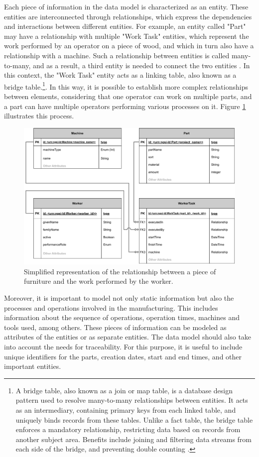 Each piece of information in the data model is characterized as an entity. These entities are interconnected through relationships, which express the dependencies and interactions between different entities. For example, an entity called "Part" may have a relationship with multiple "Work Task" entities, which represent the work performed by an operator on a piece of wood, and which in turn also have a relationship with a machine. Such a relationship between entities is called many-to-many, and as a result, a third entity is needed to connect the two entities \cite{fiware_entity_relationship}. In this context, the "Work Task" entity acts as a linking table, also known as a bridge table.\footnote{A bridge table, also known as a join or map table, is a database design pattern used to resolve many-to-many relationships between entities. It acts as an intermediary, containing primary keys from each linked table, and uniquely binds records from these tables. Unlike a fact table, the bridge table enforces a mandatory relationship, restricting data based on records from another subject area. Benefits include joining and filtering data streams from each side of the bridge, and preventing double counting \cite{international_business_machines_corporation_ibm_2023}. }. In this way, it is possible to establish more complex relationships between elements, considering that one operator can work on multiple parts, and a part can have multiple operators performing various processes on it. Figure \ref{fig: WorkTask} illustrates this process.


\begin{figure}[ht!]
    \centering
    \includegraphics[width=.65\linewidth]{images/Development/chap4/Example WorkTask.pdf} 
    \caption{Simplified representation of the relationship between a piece of furniture and the work performed by the worker.}
    \label{fig: WorkTask}
\end{figure}


Moreover, it is important to model not only static information but also the processes and operations involved in the manufacturing. This includes information about the sequence of operations, operation times, machines and tools used, among others. These pieces of information can be modeled as attributes of the entities or as separate entities. The data model should also take into account the needs for traceability. For this purpose, it is useful to include unique identifiers for the parts, creation dates, start and end times, and other important entities.

